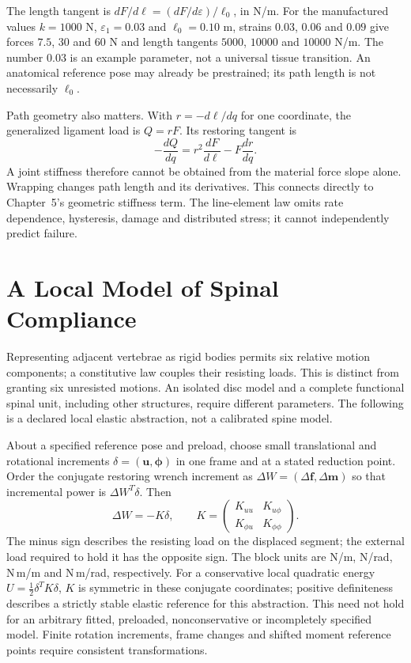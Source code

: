 The length tangent is $dF/d\ell=(dF/d\varepsilon)/\ell_0$, in N/m.
For the manufactured values $k=1000$ N, $\varepsilon_1=0.03$ and
$\ell_0=0.10$ m, strains $0.03$, $0.06$ and $0.09$ give forces
$7.5$, $30$ and $60$ N and length tangents $5000$, $10000$ and $10000$ N/m.
The number $0.03$ is an example parameter, not a universal tissue transition.
An anatomical reference pose may already be prestrained; its path length is not
necessarily $\ell_0$.

Path geometry also matters. With $r=-d\ell/dq$ for one coordinate, the generalized
ligament load is $Q=rF$. Its restoring tangent is
\begin{equation}
 -\frac{dQ}{dq}=r^2\frac{dF}{d\ell}-F\frac{dr}{dq}.
\end{equation}
A joint stiffness therefore cannot be obtained from the material force slope
alone. Wrapping changes path length and its derivatives. This connects directly
to Chapter~5's geometric stiffness term. The line-element law omits rate dependence,
hysteresis, damage and distributed stress; it cannot independently predict failure.

\section{A Local Model of Spinal Compliance}

Representing adjacent vertebrae as rigid bodies permits six relative motion
components; a constitutive law couples their resisting loads. This is distinct
from granting six unresisted motions. An isolated disc model and a complete
functional spinal unit, including other structures, require different parameters.
The following is a declared local elastic abstraction, not a calibrated spine model.

About a specified reference pose and preload, choose small translational and
rotational increments $\delta=(\bm u,\bm\phi)$ in one frame and at a stated
reduction point. Order the conjugate restoring wrench increment as
$\Delta W=(\Delta\bm f,\Delta\bm m)$ so that incremental power is
$\Delta W^T\dot\delta$. Then
\begin{equation}
 \Delta W=-K\delta,\qquad
 K=\begin{pmatrix}K_{uu}&K_{u\phi}\\K_{\phi u}&K_{\phi\phi}\end{pmatrix}.
 \label{eq:ch4:disc-stiffness}
\end{equation}
The minus sign describes the resisting load on the displaced segment; the
external load required to hold it has the opposite sign. The block units are
N/m, N/rad, N\,m/m and N\,m/rad, respectively. For a conservative local quadratic
energy $U=\tfrac12\delta^TK\delta$, $K$ is symmetric in these conjugate
coordinates; positive definiteness describes a strictly stable elastic reference
for this abstraction. This need not hold for an arbitrary fitted, preloaded,
nonconservative or incompletely specified model. Finite rotation increments,
frame changes and shifted moment reference points require consistent transformations.

